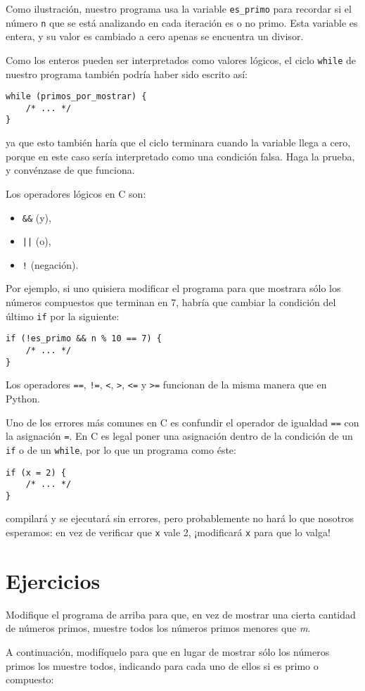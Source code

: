 Como ilustración, nuestro programa usa la variable \lstinline!es_primo!
para recordar si el número \lstinline!n! que se está analizando en cada
iteración es o no primo. Esta variable es entera, y su valor es cambiado
a cero apenas se encuentra un divisor.

Como los enteros pueden ser interpretados como valores lógicos, el ciclo
\lstinline!while! de nuestro programa también podría haber sido escrito
así:

\begin{lstlisting}
while (primos_por_mostrar) {
    /* ... */
}
\end{lstlisting}

ya que esto también haría que el ciclo terminara cuando la variable
llega a cero, porque en este caso sería interpretado como una condición
falsa. Haga la prueba, y convénzase de que funciona.

Los operadores lógicos en C son:

\begin{itemize}
\item
  \lstinline!&&! (y),
\item
  \lstinline!||! (o),
\item
  \lstinline"!" (negación).
\end{itemize}

Por ejemplo, si uno quisiera modificar el programa para que mostrara
sólo los números compuestos que terminan en 7, habría que cambiar la
condición del último \lstinline!if! por la siguiente:

\begin{lstlisting}
if (!es_primo && n % 10 == 7) {
    /* ... */
}
\end{lstlisting}

Los operadores \lstinline!==!, \lstinline"!=", \lstinline!<!,
\lstinline!>!, \lstinline!<=! y \lstinline!>=! funcionan de la misma
manera que en Python.

Uno de los errores más comunes en C es confundir el operador de igualdad
\lstinline!==! con la asignación \lstinline!=!. En C es legal poner una
asignación dentro de la condición de un \lstinline!if! o de un
\lstinline!while!, por lo que un programa como éste:

\begin{lstlisting}
if (x = 2) {
    /* ... */
}
\end{lstlisting}

compilará y se ejecutará sin errores, pero probablemente no hará lo que
nosotros esperamos: en vez de verificar que \lstinline!x! vale 2,
¡modificará \lstinline!x! para que lo valga!

\section{Ejercicios}

Modifique el programa de arriba para que, en vez de mostrar una cierta
cantidad de números primos, muestre todos los números primos menores que
\emph{m}.

A continuación, modifíquelo para que en lugar de mostrar sólo los
números primos los muestre todos, indicando para cada uno de ellos si es
primo o compuesto:
